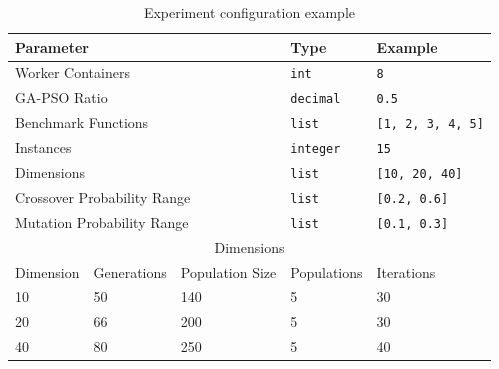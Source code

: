 \documentclass[review]{elsarticle}
\begin{document}
\begin{table}[h!tbp]
  \small
  \caption{ Experiment configuration example 
  }
  \label{tab:params}
  \centering
  \small
  \begin{tabular}{|l|l|l|l|l|}
    \hline
    \multicolumn{3}{|l|}{Parameter}                    & Type             & Example         \\ \hline
    \multicolumn{3}{|l|}{Worker Containers}        & \texttt{int}     & \texttt{8} \\ \hline
    \multicolumn{3}{|l|}{GA-PSO Ratio}                 & \texttt{decimal} & \texttt{0.5}    \\  \hline
    \multicolumn{3}{|l|}{Benchmark Functions}          & \texttt{list}    & \texttt{[1, 2, 3, 4, 5]} \\ \hline
    \multicolumn{3}{|l|}{Instances}                    & \texttt{integer}    & \texttt{15} \\ \hline
    \multicolumn{3}{|l|}{Dimensions}                   & \texttt{list}    & \texttt{[10, 20, 40]}        \\ \hline
    \multicolumn{3}{|l|}{Crossover Probability Range}  & \texttt{list}    & \texttt{[0.2, 0.6]}      \\ \hline
    \multicolumn{3}{|l|}{Mutation  Probability Range}  & \texttt{list}    & \texttt{[0.1, 0.3]}      \\ \hline
    \multicolumn{5}{|c|}{Dimensions}                                                      \\ \hline  
    Dimension               & Generations & Population Size & Populations  &     Iterations    \\ \hline
            10              & 50      & 140                 &      5                 & 30                \\ \hline
            20              & 66      & 200                 &      5                 & 30               \\ \hline
            40              & 80      & 250                 &      5                 & 40                \\ \hline
  \end{tabular}
\end{table}
\end{document}
